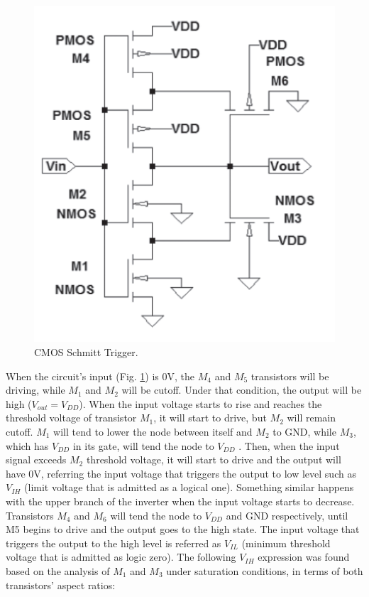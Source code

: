 \documentclass{article} %
\begin{document}
\begin{multicols}{2}
\begin{figure}[H]
\centering
\includegraphics[scale=0.4]{Images/ImagenesTesina/Antecedentes/Schmitt_Trigger.PNG}
\caption{CMOS Schmitt Trigger.}
\label{fig:Schmit}
\end{figure}

When the circuit’s input (Fig. \ref{fig:Schmit}) is 0V, the $M_4$ and $M_5$ transistors will be driving, while $M_1$ and $M_2$ will be cutoff. Under that condition, the output will be high ($V_{out} = V_{DD}$). When the input voltage starts to rise and reaches the threshold voltage of transistor $M_1$, it will start to drive, but $M_2$ will remain cutoff. $M_1$ will tend to lower the node between itself and $M_2$ to GND, while $M_3$, which has $V_{DD}$ in its gate, will tend the node to $V_{DD}$ . Then, when the input signal exceeds $M_2$ threshold voltage, it will start to drive and the output will have 0V, referring the input voltage that triggers the output to low level such as $V_{IH}$ (limit voltage that is admitted as a logical one). Something similar happens with the upper branch of the inverter when the input voltage starts to decrease. Transistors $M_4$ and $M_6$ will tend the node to $V_{DD}$  and GND respectively, until M5 begins to drive and the output goes to the high state. The input voltage that triggers the output to the high level is referred as $V_{IL}$ (minimum threshold voltage that is admitted as logic zero). The following $V_{IH}$ expression was found based on the analysis of $M_1$ and $M_3$ under saturation conditions, in terms of both transistors’ aspect ratios:


\end{multicols}
\end{document}
